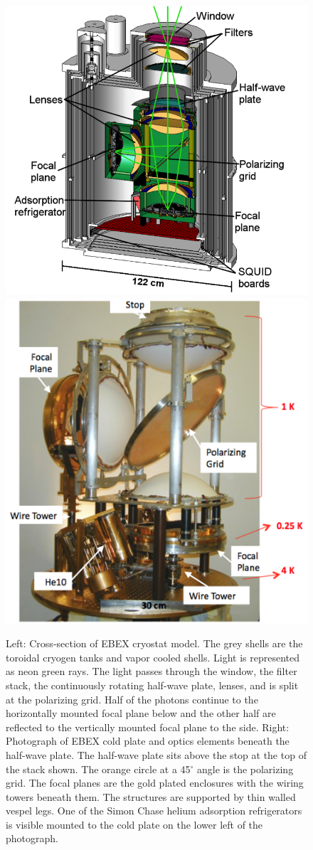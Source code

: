 \begin{figure}[htbp]
\begin{center}
\includegraphics[width=0.48\columnwidth]{figures/ebex_cryostat_cross_section.png}
\includegraphics[width=0.48\columnwidth]{figures/cryo_innards.png}
\caption[EBEX cryostat cross section and interior optics elements]{Left: Cross-section of \ac{EBEX} cryostat model. The grey shells are the toroidal cryogen tanks and vapor cooled shells. Light is represented as neon green rays. The light passes through the window, the filter stack, the continuously rotating half-wave plate, lenses, and is split at the polarizing grid. Half of the photons continue to the horizontally mounted focal plane below and the other half are reflected to the vertically mounted focal plane to the side. Right: Photograph of \ac{EBEX} cold plate and optics elements beneath the half-wave plate. The half-wave plate sits above the stop at the top of the stack shown. The orange circle at a 45$^\circ$ angle is the polarizing grid. The focal planes are the gold plated enclosures with the wiring towers beneath them. The structures are supported by thin walled vespel legs. One of the Simon Chase helium adsorption refrigerators is visible mounted to the cold plate on the lower left of the photograph. 
\label{fig:cryo_innards} }
\end{center}
\end{figure}

